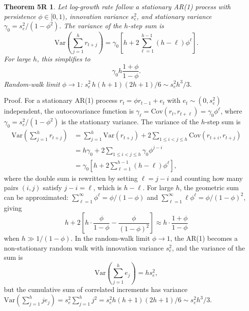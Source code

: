 \documentclass[review]{elsarticle}
\theoremstyle{plain}
\newtheorem*{theorem5R}{Theorem 5R}  %
\theoremstyle{definition}
\begin{document}
\begin{theorem5R}
Let log-growth rate follow a stationary AR(1) process with persistence $\phi \in [0, 1)$, innovation variance $s_e^2$, and stationary variance $\gamma_0 = s_e^2/(1-\phi^2)$. The variance of the $h$-step sum is
\begin{equation}
\text{Var}\left(\sum_{j=1}^h r_{t+j}\right) = \gamma_0 \left[ h + 2 \sum_{\ell=1}^{h-1} (h-\ell) \phi^\ell \right].
\end{equation}
For large $h$, this simplifies to
\begin{equation}
\gamma_0 h \frac{1+\phi}{1-\phi}.
\end{equation}
Random-walk limit $\phi \to 1$: $s_e^2 \, h(h+1)(2h+1)/6 \sim s_e^2 h^3/3$.
\end{theorem5R}

Proof. For a stationary AR(1) process $r_t = \phi r_{t-1} + e_t$ with $e_t \sim (0, s_e^2)$ independent, the autocovariance function is $\gamma_\ell = \text{Cov}(r_t, r_{t+\ell}) = \gamma_0 \phi^\ell$, where $\gamma_0 = s_e^2/(1-\phi^2)$ is the stationary variance. The variance of the $h$-step sum is
\begin{align}
\text{Var}\left(\sum_{j=1}^h r_{t+j}\right) &= \sum_{j=1}^h \text{Var}(r_{t+j}) + 2\sum_{1 \leq i < j \leq h} \text{Cov}(r_{t+i}, r_{t+j}) \\
&= h\gamma_0 + 2\sum_{1 \leq i < j \leq h} \gamma_0 \phi^{j-i} \\
&= \gamma_0 \left[ h + 2 \sum_{\ell=1}^{h-1} (h-\ell) \phi^\ell \right],
\end{align}
where the double sum is rewritten by setting $\ell = j - i$ and counting how many pairs $(i,j)$ satisfy $j - i = \ell$, which is $h - \ell$. For large $h$, the geometric sum can be approximated: $\sum_{\ell=1}^\infty \phi^\ell = \phi/(1-\phi)$ and $\sum_{\ell=1}^\infty \ell \phi^\ell = \phi/(1-\phi)^2$, giving
\begin{equation}
h + 2\left[ h \cdot \frac{\phi}{1-\phi} - \frac{\phi}{(1-\phi)^2} \right] \approx h \cdot \frac{1+\phi}{1-\phi}
\end{equation}
when $h \gg 1/(1-\phi)$. In the random-walk limit $\phi \to 1$, the AR(1) becomes a non-stationary random walk with innovation variance $s_e^2$, and the variance of the sum is
\begin{equation}
\text{Var}\left(\sum_{j=1}^h e_j\right) = h s_e^2,
\end{equation}
but the cumulative sum of correlated increments has variance $\text{Var}(\sum_{j=1}^h j e_j) = s_e^2 \sum_{j=1}^h j^2 = s_e^2 h(h+1)(2h+1)/6 \sim s_e^2 h^3/3$.
\end{document}
